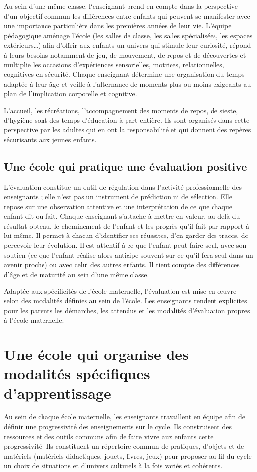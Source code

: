 Au sein d’une même classe, l‘enseignant prend en compte dans la perspective d'un objectif commun les différences entre enfants qui peuvent se manifester avec une importance particulière dans les premières années de leur vie. L’équipe pédagogique aménage l'école (les salles de classe, les salles spécialisées, les espaces extérieurs\dots) afin d’offrir aux enfants un univers qui stimule leur curiosité, répond à leurs besoins notamment de jeu, de mouvement, de repos et de découvertes et multiplie les occasions d'expériences sensorielles, motrices, relationnelles, cognitives en sécurité. Chaque enseignant détermine une organisation du temps adaptée à leur âge et veille à l’alternance de moments plus ou moins exigeants au plan de l’implication corporelle et cognitive.

L’accueil, les récréations, l’accompagnement des moments de repos, de sieste, d’hygiène sont des temps d’éducation à part entière. Ils sont organisés dans cette perspective par les adultes qui en ont la responsabilité et qui donnent des repères sécurisants aux jeunes enfants.

\section{Une école qui pratique une évaluation positive}
L’évaluation constitue un outil de régulation dans l’activité professionnelle des enseignants ; elle n’est pas un instrument de prédiction ni de sélection. Elle repose sur une observation attentive et une interprétation de ce que chaque enfant dit ou fait. Chaque enseignant s’attache à mettre en valeur, au-delà du résultat obtenu, le cheminement de l’enfant et les progrès qu’il fait par rapport à lui-même. Il permet à chacun d’identifier ses réussites, d’en garder des traces, de percevoir leur évolution. Il est attentif à ce que l’enfant peut faire seul, avec son soutien (ce que l’enfant réalise alors anticipe souvent sur ce qu’il fera seul dans un avenir proche) ou avec celui des autres enfants. Il tient compte des différences d’âge et de maturité au sein d’une même classe.

Adaptée aux spécificités de l’école maternelle, l’évaluation est mise en œuvre selon des modalités définies au sein de l’école. Les enseignants rendent explicites pour les parents les démarches, les attendus et les modalités d'évaluation propres à l'école maternelle. 

\chapter{Une école qui organise des modalités spécifiques d’apprentissage}
Au sein de chaque école maternelle, les enseignants travaillent en équipe afin de définir une progressivité des enseignements sur le cycle. Ils construisent des ressources et des outils communs afin de faire vivre aux enfants cette progressivité. Ils constituent un répertoire commun de pratiques, d’objets et de matériels (matériels didactiques, jouets, livres, jeux) pour proposer au fil du cycle un choix de situations et d’univers culturels à la fois variés et cohérents.

